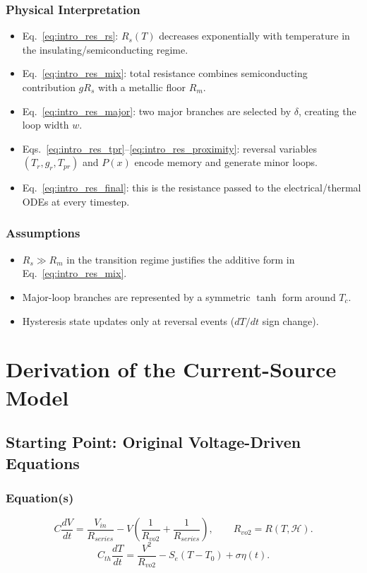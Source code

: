 \documentclass[11pt]{article}
\begin{document}
\subsubsection*{Physical Interpretation}
\begin{itemize}
    \item Eq.~\eqref{eq:intro_res_rs}: \(R_s(T)\) decreases exponentially with temperature in the insulating/semiconducting regime.
    \item Eq.~\eqref{eq:intro_res_mix}: total resistance combines semiconducting contribution \(gR_s\) with a metallic floor \(R_m\).
    \item Eq.~\eqref{eq:intro_res_major}: two major branches are selected by \(\delta\), creating the loop width \(w\).
    \item Eqs.~\eqref{eq:intro_res_tpr}--\eqref{eq:intro_res_proximity}: reversal variables \((T_r,g_r,T_{pr})\) and \(P(x)\) encode memory and generate minor loops.
    \item Eq.~\eqref{eq:intro_res_final}: this is the resistance passed to the electrical/thermal ODEs at every timestep.
\end{itemize}

\subsubsection*{Assumptions}
\begin{itemize}
    \item \(R_s\gg R_m\) in the transition regime justifies the additive form in Eq.~\eqref{eq:intro_res_mix}.
    \item Major-loop branches are represented by a symmetric \(\tanh\) form around \(T_c\).
    \item Hysteresis state updates only at reversal events (\(dT/dt\) sign change).
\end{itemize}

\section{Derivation of the Current-Source Model}

\subsection{Starting Point: Original Voltage-Driven Equations}
\subsubsection*{Equation(s)}
\begin{equation}
C\frac{dV}{dt}=\frac{V_{in}}{R_{series}}-V\left(\frac{1}{R_{vo2}}+\frac{1}{R_{series}}\right),
\qquad
R_{vo2}=R(T,\mathcal{H}).
\label{eq:sec2_start_electrical}
\end{equation}
\begin{equation}
C_{th}\frac{dT}{dt}=\frac{V^2}{R_{vo2}}-S_e(T-T_0)+\sigma\eta(t).
\label{eq:sec2_start_thermal}
\end{equation}
\end{document}
